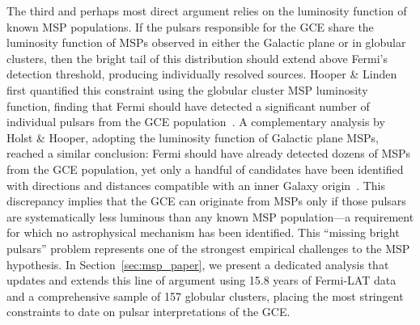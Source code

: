 The third and perhaps most direct argument relies on the luminosity function of known MSP populations.
If the pulsars responsible for the GCE share the luminosity function of MSPs observed in either the Galactic plane or in globular clusters, then the bright tail of this distribution should extend above Fermi's detection threshold, producing individually resolved sources.
Hooper \& Linden first quantified this constraint using the globular cluster MSP luminosity function, finding that Fermi should have detected a significant number of individual pulsars from the GCE population~\cite{Hooper:2016rap}.
A complementary analysis by Holst \& Hooper, adopting the luminosity function of Galactic plane MSPs, reached a similar conclusion: Fermi should have already detected dozens of MSPs from the GCE population, yet only a handful of candidates have been identified with directions and distances compatible with an inner Galaxy origin~\cite{Holst:2024fvb}.
This discrepancy implies that the GCE can originate from MSPs only if those pulsars are systematically less luminous than any known MSP population---a requirement for which no astrophysical mechanism has been identified.
This ``missing bright pulsars'' problem represents one of the strongest empirical challenges to the MSP hypothesis.
In Section~\ref{sec:msp_paper}, we present a dedicated analysis that updates and extends this line of argument using 15.8 years of Fermi-LAT data and a comprehensive sample of 157 globular clusters, placing the most stringent constraints to date on pulsar interpretations of the GCE.
